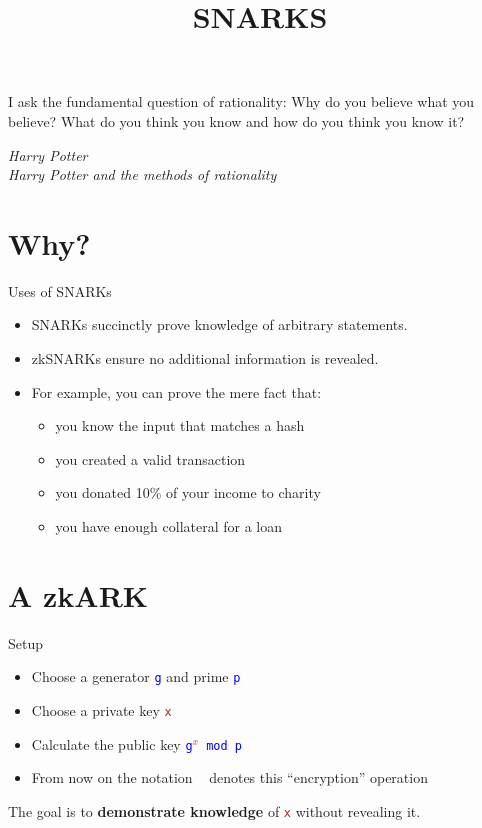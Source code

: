 \documentclass[dvipsnames]{beamer}
\newcommand{\pub}[1]{\textcolor{blue}{\texttt{#1}}}
\newcommand{\priv}[1]{\textcolor{brown}{\texttt{#1}}}
\newcommand{\enc}[1]{\colorbox{SkyBlue!75}{\textcolor{white}{\texttt{#1}}}}
\begin{document}
    \title{SNARKS}
    \date{}

    \begin{frame}
        \maketitle

        \epigraph{I ask the fundamental question of rationality: Why do you believe what you believe? What do you think you know and how do you think you know it?}{\textit{Harry Potter\\Harry Potter and the methods of rationality}}
    \end{frame}

    \section{Why?}

    \begin{frame}{Uses of SNARKs}
        \begin{itemize}
            \item SNARKs succinctly prove knowledge of arbitrary statements.
            \item zkSNARKs ensure no additional information is revealed.
            \item For example, you can prove the mere fact that:
            \begin{itemize}
                \item you know the input that matches a hash
                \item you created a valid transaction
                \item you donated 10\% of your income to charity
                \item you have enough collateral for a loan
            \end{itemize}
        \end{itemize}
        \qedhere
    \end{frame}


    \section{A zkARK}

    \begin{frame}{Setup}
        \begin{itemize}
            \item Choose a generator \pub{g} and prime \pub{p}
            \item Choose a private key \priv{x}
            \item Calculate the public key \pub{g\priv{$^x$} mod p}
            \item From now on the notation \enc{x} denotes this ``encryption'' operation
        \end{itemize}

        \begin{block}{}
            The goal is to \textbf{demonstrate knowledge} of \priv{x} without revealing it.
        \end{block}
    \end{frame}
\end{document}

